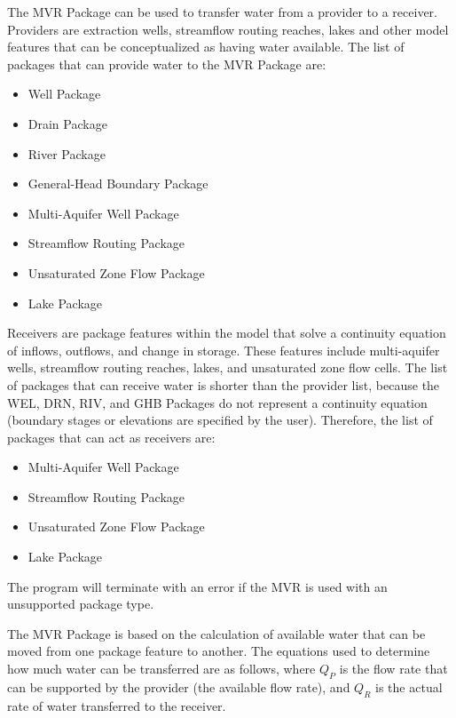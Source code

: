 The MVR Package can be used to transfer water from a provider to a receiver.  Providers are extraction wells, streamflow routing reaches, lakes and other model features that can be conceptualized as having water available.  The list of packages that can provide water to the MVR Package are:

\begin{itemize}
  \item Well Package
  \item Drain Package
  \item River Package
  \item General-Head Boundary Package
  \item Multi-Aquifer Well Package
  \item Streamflow Routing Package
  \item Unsaturated Zone Flow Package
  \item Lake Package
\end{itemize}

Receivers are package features within the model that solve a continuity equation of inflows, outflows, and change in storage.  These features include multi-aquifer wells, streamflow routing reaches, lakes, and unsaturated zone flow cells.  The list of packages that can receive water is shorter than the provider list, because the WEL, DRN, RIV, and GHB Packages do not represent a continuity equation (boundary stages or elevations are specified by the user).  Therefore, the list of packages that can act as receivers are:

\begin{itemize}
  \item Multi-Aquifer Well Package
  \item Streamflow Routing Package
  \item Unsaturated Zone Flow Package
  \item Lake Package
\end{itemize}

\noindent The program will terminate with an error if the MVR is used with an unsupported package type.

The MVR Package is based on the calculation of available water that can be moved from one package feature to another.  The equations used to determine how much water can be transferred are as follows, where $Q_P$ is the flow rate that can be supported by the provider (the available flow rate), and $Q_R$ is the actual rate of water transferred to the receiver.

